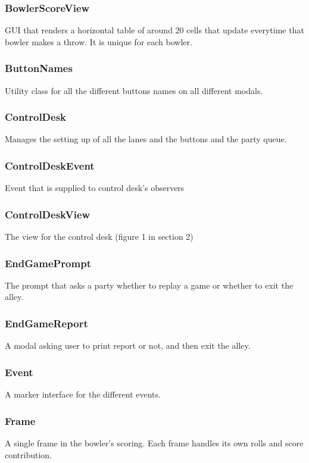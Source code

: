 \subsubsection{BowlerScoreView}
GUI that renders a horizontal table of around 20 cells that update everytime that bowler makes a throw. It is unique for each bowler.

\subsubsection{ButtonNames}
Utility class for all the different buttons names on all different modals.

\subsubsection{ControlDesk}
Manages the setting up of all the lanes and the buttons and the party queue.

\subsubsection{ControlDeskEvent}
Event that is supplied to control desk's observers

\subsubsection{ControlDeskView}
The view for the control desk (figure 1 in section 2)

\subsubsection{EndGamePrompt}
The prompt that asks a party whether to replay a game or whether to exit the alley.

\subsubsection{EndGameReport}
A modal asking user to print report or not, and then exit the alley.

\subsubsection{Event}
A marker interface for the different events.

\subsubsection{Frame}
A single frame in the bowler's scoring. Each frame handles its own rolls and score contribution.

